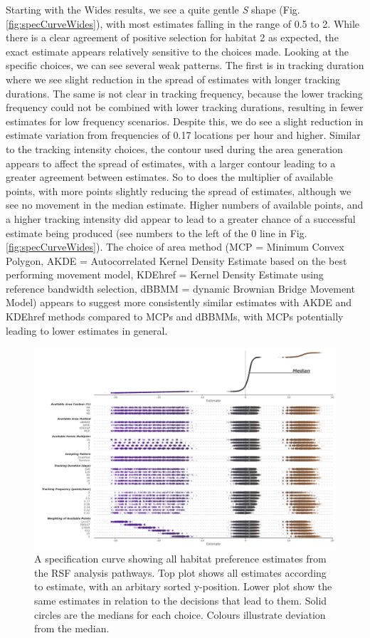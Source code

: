 \documentclass[10pt,a4paper]{article}
\begin{document}
Starting with the Wides results, we see a quite gentle \emph{S} shape (Fig. \ref{fig:specCurveWides}), with most estimates falling in the range of 0.5 to 2.
While there is a clear agreement of positive selection for habitat 2 as expected, the exact estimate appears relatively sensitive to the choices made.
Looking at the specific choices, we can see several weak patterns.
The first is in tracking duration where we see slight reduction in the spread of estimates with longer tracking durations.
The same is not clear in tracking frequency, because the lower tracking frequency could not be combined with lower tracking durations, resulting in fewer estimates for low frequency scenarios.
Despite this, we do see a slight reduction in estimate variation from frequencies of 0.17 locations per hour and higher.
Similar to the tracking intensity choices, the contour used during the area generation appears to affect the spread of estimates, with a larger contour leading to a greater agreement between estimates.
So to does the multiplier of available points, with more points slightly reducing the spread of estimates, although we see no movement in the median estimate.
Higher numbers of available points, and a higher tracking intensity did appear to lead to a greater chance of a successful estimate being produced (see numbers to the left of the 0 line in Fig. \ref{fig:specCurveWides}).
The choice of area method (MCP = Minimum Convex Polygon, AKDE = Autocorrelated Kernel Density Estimate based on the best performing movement model, KDEhref = Kernel Density Estimate using reference bandwidth selection, dBBMM = dynamic Brownian Bridge Movement Model) appears to suggest more consistently similar estimates with AKDE and KDEhref methods compared to MCPs and dBBMMs, with MCPs potentially leading to lower estimates in general.

\begin{figure}
\includegraphics[width=1\linewidth]{../figures/rsfSpecCurve} \caption{A specification curve showing all habitat preference estimates from the RSF analysis pathways. Top plot shows all estimates according to estimate, with an arbitary sorted y-position. Lower plot show the same estimates in relation to the decisions that lead to them. Solid circles are the medians for each choice. Colours illustrate deviation from the median.}\label{fig:specCurveRSF}
\end{figure}
\end{document}
